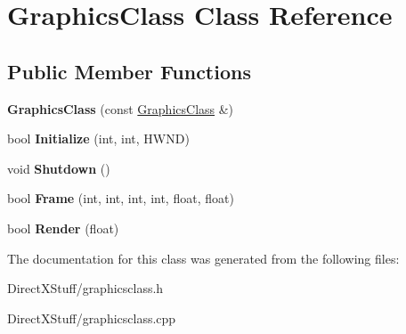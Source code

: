 \hypertarget{class_graphics_class}{\section{Graphics\-Class Class Reference}
\label{class_graphics_class}
}
\subsection*{Public Member Functions}
\begin{DoxyCompactItemize}
\item 
\hypertarget{class_graphics_class_a46a3311316c5057120e99b48d1921c5b}{{\bfseries Graphics\-Class} (const \hyperlink{class_graphics_class}{Graphics\-Class} \&)}\label{class_graphics_class_a46a3311316c5057120e99b48d1921c5b}

\item 
\hypertarget{class_graphics_class_a5489d2f79c2ed431cabd51f93e77cdf6}{bool {\bfseries Initialize} (int, int, H\-W\-N\-D)}\label{class_graphics_class_a5489d2f79c2ed431cabd51f93e77cdf6}

\item 
\hypertarget{class_graphics_class_a3f44e9b9083f1d1a5246bb0f2158b1a9}{void {\bfseries Shutdown} ()}\label{class_graphics_class_a3f44e9b9083f1d1a5246bb0f2158b1a9}

\item 
\hypertarget{class_graphics_class_a42c0fab2574b27039cb62af6a4352ce5}{bool {\bfseries Frame} (int, int, int, int, float, float)}\label{class_graphics_class_a42c0fab2574b27039cb62af6a4352ce5}

\item 
\hypertarget{class_graphics_class_a90c750beff81bb2d6f2126feb78e9d2d}{bool {\bfseries Render} (float)}\label{class_graphics_class_a90c750beff81bb2d6f2126feb78e9d2d}

\end{DoxyCompactItemize}


The documentation for this class was generated from the following files\-:\begin{DoxyCompactItemize}
\item 
Direct\-X\-Stuff/graphicsclass.\-h\item 
Direct\-X\-Stuff/graphicsclass.\-cpp\end{DoxyCompactItemize}

